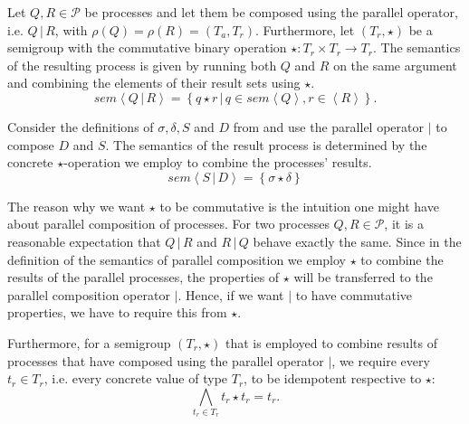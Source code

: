 \begin{definition}
\label{def:sem_parallel}
Let $Q, R \in \mathcal{P}$ be processes and let them be composed using the parallel operator, i.e. $Q \,|\, R$, with $\rho \left( Q \right) = \rho \left( R \right) = \left( T_a, T_r \right)$. Furthermore, let $\left( T_r, \star \right)$ be a semigroup with the commutative binary operation $\star \colon T_r \times T_r \to T_r$. The semantics of the resulting process is given by running both $Q$ and $R$ on the same argument and combining the elements of their result sets using $\star$.
  \begin{equation}
    \label{eqn:sem_parallel}
    sem \left\langle Q \,|\, R \right\rangle = \left\{ q \star r \,|\, q \in sem \left\langle Q \right\rangle, r \in \left\langle R \right\rangle \right\}.
  \end{equation}
  \hfill\qedsymbol
\end{definition}

\begin{example}
\label{exp:sem_parallel}
Consider the definitions of $\sigma, \delta, S$ and $D$ from  and use the parallel operator $|$ to compose $D$ and $S$. The semantics of the result process is determined by the concrete $\star$-operation we employ to combine the processes' results.
  \begin{equation}
    sem \left\langle S \,|\, D \right\rangle = \left\{ \sigma \star \delta \right\}
  \end{equation}
  \hfill\qedsymbol
\end{example}

The reason why we want $\star$ to be commutative is the intuition one might have about parallel composition of processes. For two processes $Q, R \in \mathcal{P}$, it is a reasonable expectation that $Q \,|\, R$ and $R \,|\, Q$ behave exactly the same. Since in the definition of the semantics of parallel composition we employ $\star$ to combine the results of the parallel processes, the properties of $\star$ will be transferred to the parallel composition operator $|$. Hence, if we want $|$ to have commutative properties, we have to require this from $\star$.

Furthermore, for a semigroup $\left(T_r, \star \right)$ that is employed to combine results of processes that have composed using the parallel operator $|$, we require every $t_r \in T_r$, i.e. every concrete value of type $T_r$, to be idempotent respective to $\star$:
\begin{equation}
  \label{eqn:idempotence}
  \bigwedge_{t_r \in T_r} t_r \star t_r = t_r.
\end{equation}

